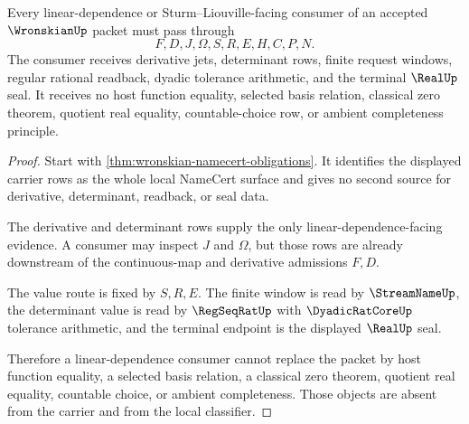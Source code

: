 \begin{theorem}
\label{thm:wronskian-linear-dependence-boundary}
Every linear-dependence or Sturm--Liouville-facing consumer of an accepted $\WronskianUp$ packet must pass through
$$
F,D,J,\Omega,S,R,E,H,C,P,N .
$$
The consumer receives derivative jets, determinant rows, finite request windows, regular rational readback, dyadic tolerance arithmetic, and the terminal $\RealUp$ seal. It receives no host function equality, selected basis relation, classical zero theorem, quotient real equality, countable-choice row, or ambient completeness principle.
\end{theorem}
\begin{proof}
Start with \autoref{thm:wronskian-namecert-obligations}. It identifies the displayed carrier rows as the whole local NameCert surface and gives no second source for derivative, determinant, readback, or seal data.

The derivative and determinant rows supply the only linear-dependence-facing evidence. A consumer may inspect $J$ and $\Omega$, but those rows are already downstream of the continuous-map and derivative admissions $F,D$.

The value route is fixed by $S,R,E$. The finite window is read by $\StreamNameUp$, the determinant value is read by $\RegSeqRatUp$ with $\DyadicRatCoreUp$ tolerance arithmetic, and the terminal endpoint is the displayed $\RealUp$ seal.

Therefore a linear-dependence consumer cannot replace the packet by host function equality, a selected basis relation, a classical zero theorem, quotient real equality, countable choice, or ambient completeness. Those objects are absent from the carrier and from the local classifier.
\end{proof}

